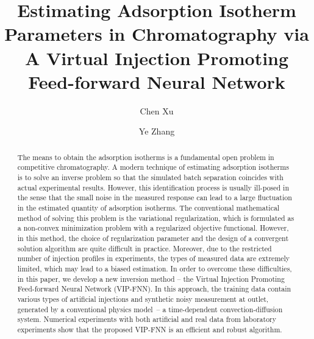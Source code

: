 \documentclass[thmsa,onecolumn,12pt]{article}%
\begin{document}
%
%
\title{Estimating Adsorption Isotherm Parameters in Chromatography via A Virtual Injection Promoting Feed-forward Neural Network}

\author[1]{Chen Xu}
\author[2,1]{Ye Zhang}
\date{}

\maketitle

\begin{abstract}
The means to obtain the adsorption isotherms is a fundamental open problem in competitive chromatography. A modern technique of estimating adsorption isotherms is to solve an inverse problem so that the simulated batch separation coincides with actual experimental results. However, this identification process is usually ill-posed in the sense that the small noise in the measured response can lead to a large fluctuation in the estimated quantity of adsorption isotherms. The conventional mathematical method of solving this problem is the variational regularization, which is formulated as a non-convex minimization problem with a regularized objective functional. However, in this method, the choice of regularization parameter and the design of a convergent solution algorithm are quite difficult in practice. Moreover, due to the restricted number of injection profiles in experiments, the types of measured data are extremely limited, which may lead to a biased estimation. In order to overcome these difficulties, in this paper, we develop a new inversion method -- the Virtual Injection Promoting Feed-forward Neural Network (VIP-FNN). In this approach, the training data contain various types of artificial injections and synthetic noisy measurement at outlet, generated by a conventional physics model~-- a time-dependent convection-diffusion system. Numerical experiments with both artificial and real data from laboratory experiments show that the proposed VIP-FNN is an efficient and robust algorithm.
\end{abstract}

%
\end{document}
